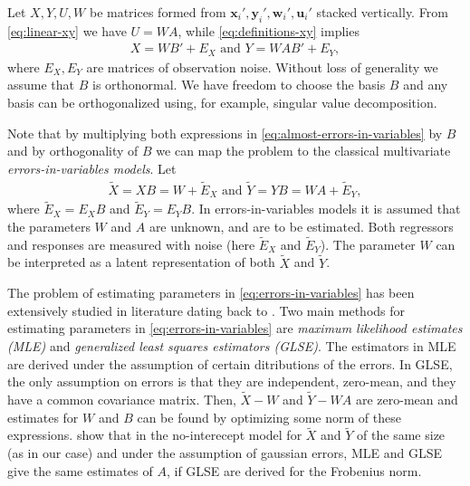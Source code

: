\documentclass[preprint]{imsart}
\numberwithin{equation}{section}
\theoremstyle{plain}
\newcommand{\by}{\mathbf{y}}
\newcommand{\bx}{\mathbf{x}}
\newcommand{\bw}{\mathbf{w}}
\newcommand{\bu}{\mathbf{u}}
\DeclareMathOperator*{\rank}{rank}
\begin{document}
Let $X,Y,U,W$ be matrices formed from $\bx_i',\by_i',\bw_i',\bu_i'$ stacked vertically. From \eqref{eq:linear-xy} we have $U = WA$, while \eqref{eq:definitions-xy} implies
\begin{align}\label{eq:almost-errors-in-variables}
X = WB' + E_X \text{ \ and \ } Y = WA B' + E_{Y},
\end{align}
where $E_X,E_Y$ are matrices of observation noise. Without loss of generality we assume that $B$ is orthonormal. We have freedom to choose the basis $B$ and any basis can be orthogonalized using, for example, singular value decomposition. 

Note that by multiplying both expressions in \eqref{eq:almost-errors-in-variables} by $B$ and by orthogonality of $B$ we can map the problem to the classical multivariate {\em errors-in-variables models}. Let
\begin{align}\label{eq:errors-in-variables}
  \tilde{X} = XB = W + \tilde{E}_X \text{ and } \tilde{Y} = YB = WA + \tilde{E}_Y,
\end{align}  
where $\tilde{E}_X = E_XB$ and $\tilde{E}_Y = E_YB$. In errors-in-variables models it is assumed that the parameters $W$ and $A$ are unknown, and are to be estimated. Both regressors and responses are measured with noise (here $\tilde{E}_X$ and $\tilde{E}_Y$). The parameter $W$ can be interpreted as a latent representation of both $\tilde{X}$ and $\tilde{Y}$.

The problem of estimating parameters in \eqref{eq:errors-in-variables} has been extensively studied in literature dating back to \citet{adcock1878problem}. Two main methods for estimating parameters in \eqref{eq:errors-in-variables} are {\em maximum likelihood estimates (MLE)} and {\em generalized least squares estimators (GLSE)}. The estimators in MLE are derived under the assumption of certain ditributions of the errors. In GLSE, the only assumption on errors is that they are independent, zero-mean, and they have a common covariance matrix. Then, $\tilde{X} - W$ and $\tilde{Y} - WA$ are zero-mean and estimates for $W$ and $B$ can be found by optimizing some norm of these expressions. \citet{gleser1973estimation} show that in the no-interecept model for $\tilde{X}$ and $\tilde{Y}$ of the same size (as in our case) and under the assumption of gaussian errors, MLE and GLSE give the same estimates of $A$, if GLSE are derived for the Frobenius norm.

\end{document}
